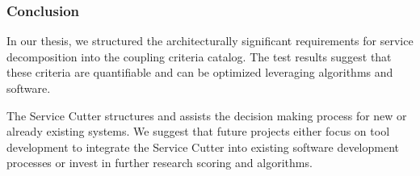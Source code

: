 \subsubsection{Conclusion}
In our thesis, we structured the architecturally significant requirements for service decomposition into the coupling criteria catalog. The test results suggest that these criteria are quantifiable and can be optimized leveraging algorithms and software. 

The Service Cutter structures and assists the decision making process for new or already existing systems. We suggest that future projects either focus on tool development to integrate the Service Cutter into existing software development processes or invest in further research scoring and algorithms. 
